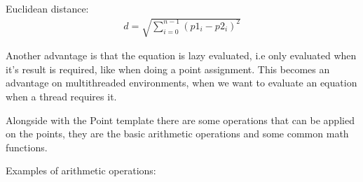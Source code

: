 \documentclass[letterpaper,10pt,english]{sphinxmanual}
\begin{document}
\sphinxAtStartPar
Euclidean distance:
\begin{equation*}
\begin{split}d = \sqrt { \sum_{i=0}^{n-1} (p1_{i} - p2_{i})^{2}}\end{split}
\end{equation*}
\begin{sphinxVerbatim}[commandchars=\\\{\}]
    

       
\end{sphinxVerbatim}

\sphinxAtStartPar
Another advantage is that the equation is lazy evaluated, i.e only evaluated when it’s result is required, like when doing a point assignment. This becomes an advantage on multithreaded environments, when
we want to evaluate an equation when a thread requires it.

\sphinxAtStartPar
Alongside with the Point template there are some operations that can be applied on the points, they are the basic arithmetic operations and some common math functions.

\sphinxAtStartPar
Examples of arithmetic operations:

\begin{sphinxVerbatim}[commandchars=\\\{\}]
    
     

    
    
  
\end{sphinxVerbatim}
\end{document}
